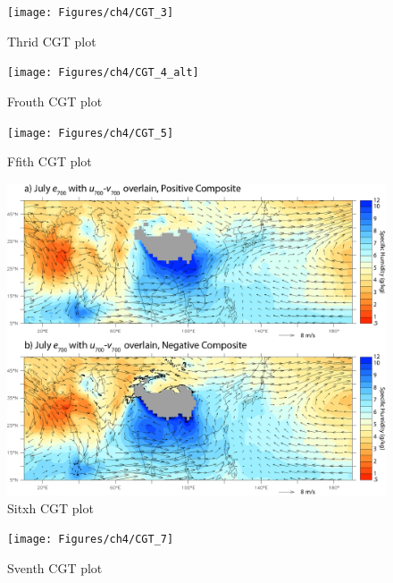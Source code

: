 \begin{figure}
\centering
\noindent\texttt{[image: Figures/ch4/CGT\_3]}
\caption{Thrid CGT plot}
\label{fig:cgt3}
\end{figure}

\begin{figure}
\centering
\noindent\texttt{[image: Figures/ch4/CGT\_4\_alt]}
\caption{Frouth CGT plot}
\label{fig:cgt4}
\end{figure}

\begin{figure}
\centering
\noindent\texttt{[image: Figures/ch4/CGT\_5]}
\caption{Ffith CGT plot}
\label{fig:cgt5}
\end{figure}

\begin{figure}
\centering
\noindent\includegraphics[width=36pc]{Figures/ch4/CGT_6}
\caption{Sitxh CGT plot}
\label{fig:cgt6}
\end{figure}

\begin{figure}
\centering
\noindent\texttt{[image: Figures/ch4/CGT\_7]}
\caption{Sventh CGT plot}
\label{fig:cgt7}
\end{figure}

